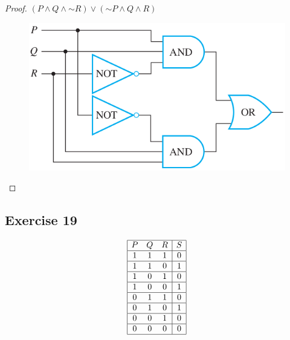 \documentclass[14pt]{extarticle}
\begin{document}
\begin{proof} $(P \wedge Q \wedge {\sim R}) \vee ({\sim P} \wedge Q \wedge R)$
\begin{figure}[ht!] \centering \includegraphics[scale=0.5]{../images/2.4.18.png}
\end{figure} \end{proof}

\subsection{Exercise 19} $$ \begin{array}{|ccc|c|} \hline P&Q&R&S\\ \hline
1&1&1&0\\ \hline 1&1&0&1\\ \hline 1&0&1&0\\ \hline 1&0&0&1\\ \hline 0&1&1&0\\
\hline 0&1&0&1\\ \hline 0&0&1&0\\ \hline 0&0&0&0\\ \hline \end{array} $$
\end{document}
